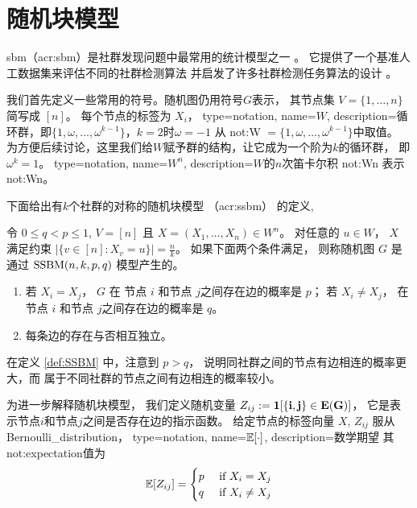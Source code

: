 \section{随机块模型}\label{sec:sbm}
\gls{sbm}（\gls{acr:sbm}）是社群发现问题中最常用的统计模型之一
\cite{holland1983stochastic, abbe2017community}。
它提供了一个基准人工数据集来评估不同的社群检测算法
并启发了许多社群检测任务算法的设计 \cite{fortunato2010community}。

我们首先定义一些常用的符号。随机图仍用符号$G$表示，
其节点集 $V=\{1,\dots, n\}$ 简写成 $[n]$。
每个节点的标签为 $X_i$，
{
  type=notation,
  name={\ensuremath{W}},
  description={循环群，即$\{1, \omega, \dots, \omega^{k-1}\}$，$k=2$时$\omega=-1$}
}
从 \gls{not:W} $= \{1, \omega, \dots, \omega^{k-1}\}$中取值。
为方便后续讨论，这里我们给$W$赋予群的结构，让它成为一个阶为$k$的循环群，
即$\omega^k=1$。
{
  type=notation,
  name={\ensuremath{W^n}},
  description={$W$的$n$次笛卡尔积}
}
\gls{not:Wn} 表示 \glsdesc{not:Wn}。 

下面给出有$k$个社群的对称的随机块模型
（\gls{acr:ssbm}）
的定义, 
	\begin{definition}\label{def:SSBM}
	令 $0\leq q<p\leq 1$, $V=[n]$ 且
  $X=(X_1,\dots,X_n)\in W^n$。 对任意的 $u\in W$，
  $X$ 满足约束
  $|\{v \in [n] : X_v = u\}| = \frac{n}{k}$。
	如果下面两个条件满足，
  则称随机图 $G$ 是通过 $\operatorname{SSBM}(n,k,p,q)$ 模型产生的。 
	\begin{enumerate}
	\item 若 $X_i=X_j$， $G$ 在 节点 $i$ 和节点 $j$之间存在边的概率是 $p$； 
 若 $X_i \neq X_j$，  在 节点 $i$ 和节点 $j$之间存在边的概率是 $q$。
	\item 每条边的存在与否相互独立。
	\end{enumerate}
\end{definition}

在定义 \ref{def:SSBM} 中，注意到 $p>q$，
说明同社群之间的节点有边相连的概率更大，而
属于不同社群的节点之间有边相连的概率较小。

为进一步解释随机块模型，
我们定义随机变量 $Z_{ij}:=\bf{1}[\{i,j\} \in E(G)]$，
它是表示节点$i$和节点$j$之间是否存在边的指示函数。
给定节点的标签向量 $X$, 
$Z_{ij}$ 服从 \gls{Bernoulli_distribution}，
{
  type=notation,
  name={$\operatorname{\mathbb{E}}[\cdot]$},
  description={数学期望}
}
其 \glsdesc{not:expectation}值为
\begin{equation}
\operatorname{\mathbb{E}}[Z_{ij}] =
\begin{cases}
p & \textrm{ if } X_i = X_j \\ 
q & \textrm{ if }  X_i \neq X_j
\end{cases}
\end{equation}

